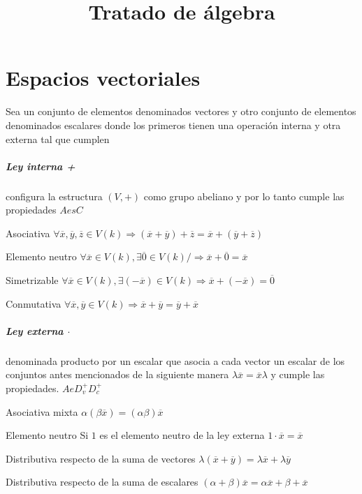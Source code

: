 

\title{Tratado de álgebra}

\renewcommand\vec{\overline}


\maketitle
\tableofcontents
\newpage

\chapter{Espacios vectoriales}
Sea un conjunto de elementos denominados vectores y otro conjunto de elementos denominados
escalares donde los primeros tienen una operación interna y otra externa tal que cumplen

\paragraph{Ley interna +} configura la estructura $(V,+)$ como grupo abeliano y por lo tanto
cumple las propiedades $AesC$
\begin{propiedades}
\item Asociativa $\forall\vec{x},\vec{y},\vec{z}\in
	V(k)\Rightarrow(\vec{x}+\vec{y})+\vec{z}=\vec{x}+(\vec{y}+\vec{z})$
\item Elemento neutro $\forall\vec{x}\in V(k), \exists\vec{0}\in V(k) /  \Rightarrow
	\vec{x}+\vec{0}=\vec{x}$
\item Simetrizable $\forall \vec{x}\in V(k), \exists(-\vec{x})\in V(k) \Rightarrow
	\vec{x}+(-\vec{x})=\vec{0}$
\item Conmutativa $\forall\vec{x},\vec{y}\in V(k)\Rightarrow\vec{x}+\vec{y}=\vec{y}+\vec{x}$
\end{propiedades}

\paragraph{Ley externa $\cdot$} denominada producto por un escalar que asocia a cada vector un
escalar de los conjuntos antes mencionados de la siguiente manera $\lambda\vec{x}=\vec{x}\lambda$
y cumple las propiedades. $AeD^+_vD^+_c$

\begin{propiedades}
\item Asociativa mixta $\alpha(\beta\vec{x})=(\alpha\beta)\vec{x}$
\item Elemento neutro Si $1$ es el elemento neutro de la ley externa $1\cdot\vec{x}=\vec{x}$
\item Distributiva respecto de la suma de vectores
	$\lambda(\vec{x}+\vec{y})=\lambda\vec{x}+\lambda\vec{y}$
\item Distributiva respecto de la suma de escalares
	$(\alpha+\beta)\vec{x}=\alpha\vec{x}+\beta+\vec{x}$
\end{propiedades}

